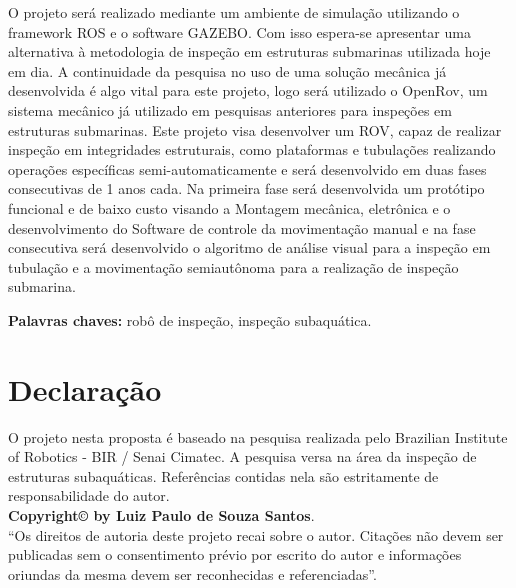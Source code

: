 O projeto será realizado mediante um ambiente de simulação utilizando o framework ROS e o software GAZEBO. Com isso espera-se apresentar uma alternativa à metodologia de inspeção em estruturas submarinas utilizada hoje em dia. A continuidade da pesquisa no uso de uma solução mecânica já desenvolvida é algo vital para este projeto, logo será utilizado o OpenRov, um sistema mecânico já utilizado em pesquisas anteriores para inspeções em estruturas submarinas.
Este projeto visa desenvolver um ROV, capaz de realizar inspeção em integridades estruturais, como plataformas e tubulações realizando operações específicas semi-automaticamente e será desenvolvido em duas fases consecutivas de 1 anos cada. Na primeira fase será desenvolvida um protótipo funcional e de baixo custo visando a Montagem mecânica, eletrônica e o desenvolvimento do Software de controle da movimentação manual e na fase consecutiva será desenvolvido o algoritmo de análise visual para a inspeção em tubulação e a movimentação semiautônoma para a realização de inspeção submarina.

 

\vspace*{1cm}
\noindent \textbf{Palavras chaves: }robô de inspeção, inspeção subaquática.


\chapter*{Declaração}
O projeto nesta proposta é baseado na pesquisa realizada pelo Brazilian Institute of Robotics - BIR / Senai Cimatec. A pesquisa versa na área da inspeção de estruturas subaquáticas. Referências contidas nela são estritamente de responsabilidade do autor.\\
\vspace*{8cm}
\vfill
\noindent \textbf{Copyright\copyright{} by Luiz Paulo de Souza Santos}.\\
``Os direitos de autoria deste projeto recai sobre o autor. Citações não devem ser publicadas sem o consentimento prévio por escrito do autor e informações oriundas da mesma devem ser reconhecidas e referenciadas''.



